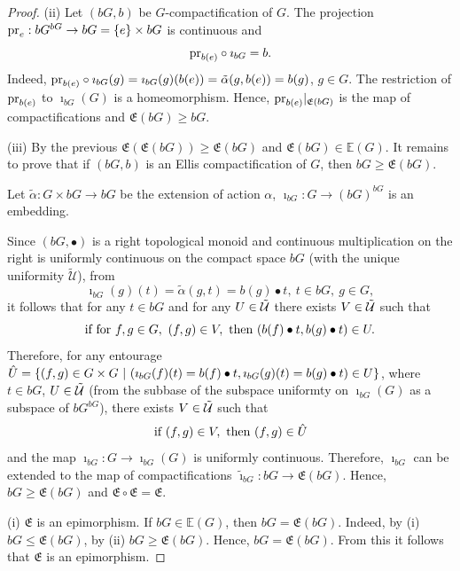 \documentclass[10pt,a4paper]{amsart}
\newcommand{\pr}{\mbox{{\rm pr}}}
\begin{document}
\begin{proof}
\medskip

(ii) Let $(b G, b)$ be $G$-compactification of $G$. The projection $\pr_{e}: b G^{b G}\to b G=\{e\}\times b G$ is continuous and 
$$\pr_{b(e)}\circ\imath_{b G}=b.$$
Indeed, $\pr_{b(e)}\circ\imath_{b G}(g)=\imath_{b G}(g)(b(e))=\tilde\alpha (g, b(e))=b(g)$, $g\in G$. The restriction of $\pr_{b(e)}$ to $\imath_{b G} (G)$ is a homeomorphism. Hence,  $\pr_{b(e)}|_{\mathfrak{E}(b G)}$ is the map of compactifications and $\mathfrak{E}(b G)\geq b G$. 

\medskip

(iii) By the previous $\mathfrak{E}(\mathfrak{E}(b G))\geq\mathfrak{E} (b G)$ and   $\mathfrak{E}(b G)\in\mathbb{E} (G)$. It remains to prove that if $(b G, b)$ is an Ellis compactification of $G$, then $b G\geq\mathfrak{E}(b G)$. 

Let $\tilde\alpha: G\times bG\to bG$ be the extension of action $\alpha$, $\imath_{b G}: G\to (bG)^{bG}$ is an embedding. 

Since $(bG, \bullet)$ is a right topological monoid and continuous multiplication on the right is uniformly continuous on the compact space $b G$ (with the unique uniformity $\tilde{\mathcal U}$), from 
$$\imath_{b G} (g)(t)=\tilde\alpha (g, t)=b (g)\bullet t,\ t\in bG,\ g\in G,$$
it follows that for any $t\in bG$ and   for any ${\rm U}\in \tilde{\mathcal U}$ there exists ${\rm V}\in \tilde{\mathcal U}$ such that 
$$\mbox{if for}\ f, g\in G,\ (f, g)\in {\rm V},\ \mbox{then}\ (b (f)\bullet t, b (g)\bullet t)\in {\rm U}.$$
Therefore, for any entourage $\hat {\rm U}=\{ (f, g)\in G\times G\ |\ (\imath_{b G} (f)(t)=b (f)\bullet t, \imath_{b G} (g)(t)=b (g)\bullet t)\in {\rm U}\}$, where $t\in bG$, ${\rm U}\in\tilde{\mathcal U}$ (from the subbase of the subspace uniformty on $\imath_{b G}(G)$ as a subspace of $b G^{b G}$), there exists  ${\rm V}\in\tilde{\mathcal U}$ such that 
$$\mbox{if}\ (f, g)\in {\rm V},\ \mbox{then}\  (f, g)\in \hat {\rm U}$$
and the map $\imath_{b G}: G\to\imath_{b G} (G)$ is uniformly continuous. Therefore,  $\imath_{b G}$ can be extended to the map of compactifications $\tilde\imath_{b G}: b G\to\mathfrak{E}(b G)$. Hence, $b G\geq\mathfrak{E}(b G)$ and $\mathfrak{E}\circ\mathfrak{E}=\mathfrak{E}$.

\medskip

(i) $\mathfrak{E}$ is an epimorphism. If $b G\in\mathbb{E}(G)$, then $b G=\mathfrak{E}(b G)$. Indeed, by (i) $b G\leq\mathfrak{E}(b G)$, by (ii) $b G\geq\mathfrak{E}(b G)$. Hence, $b G=\mathfrak{E}(b G)$. From this it follows that $\mathfrak{E}$ is an epimorphism. 
\end{proof}
\end{document}
